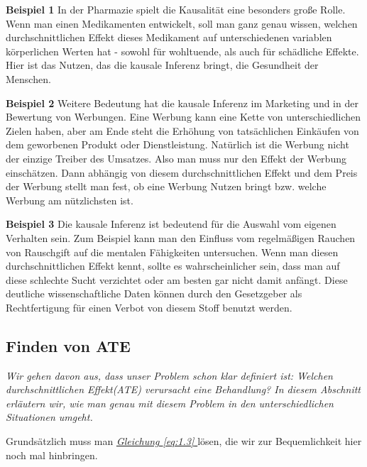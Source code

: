\documentclass[12pt,a4paper,twoside]{scrartcl}
\numberwithin{equation}{section}
\renewcommand*{\refeq}[1]{\emph{\hyperref[#1]{Gleichung \ref*{#1} }}}
\begin{document}
\noindent
\textbf{Beispiel 1}\label{motivationBeispiel1} In der Pharmazie spielt die Kausalität eine besonders große Rolle. Wenn man einen Medikamenten entwickelt, soll man ganz genau wissen, welchen durchschnittlichen Effekt dieses Medikament auf unterschiedenen variablen körperlichen Werten hat - sowohl für wohltuende, als auch für schädliche Effekte. Hier ist das Nutzen, das die kausale Inferenz bringt, die Gesundheit der Menschen.\par

\noindent
\textbf{Beispiel 2}\label{motivationBeispiel2} Weitere Bedeutung hat die kausale Inferenz im Marketing und in der Bewertung von Werbungen. Eine Werbung kann eine Kette von unterschiedlichen Zielen haben, aber am Ende steht die Erhöhung von tatsächlichen Einkäufen von dem geworbenen Produkt oder Dienstleistung. Natürlich ist die Werbung nicht der einzige Treiber des Umsatzes. Also man muss nur den Effekt der Werbung einschätzen. Dann abhängig von diesem durchschnittlichen Effekt und dem Preis der Werbung stellt man fest, ob eine Werbung Nutzen bringt bzw. welche Werbung am nützlichsten ist.\par

\noindent
\textbf{Beispiel 3}\label{motivationBeispiel3} Die kausale Inferenz ist bedeutend für die Auswahl vom eigenen Verhalten sein. Zum Beispiel kann man den Einfluss vom regelmäßigen Rauchen von Rauschgift auf die mentalen Fähigkeiten untersuchen. Wenn man diesen durchschnittlichen Effekt kennt, sollte es wahrscheinlicher sein, dass man auf diese schlechte Sucht verzichtet oder am besten gar nicht damit anfängt. Diese deutliche wissenschaftliche Daten können durch den Gesetzgeber als Rechtfertigung für einen Verbot von diesem Stoff benutzt werden.\par
\subsection{Finden von ATE}\label{subsec:findenATE}
\noindent
\textit{Wir gehen davon aus, dass unser Problem schon klar definiert ist: Welchen durchschnittlichen Effekt(ATE) verursacht eine Behandlung? In diesem Abschnitt erläutern wir, wie man genau mit diesem Problem in den unterschiedlichen Situationen umgeht.}\par

\vspace{7mm}

Grundsätzlich muss man \refeq{eq:1.3} lösen, die wir zur Bequemlichkeit hier noch mal hinbringen.\par 
\end{document}
